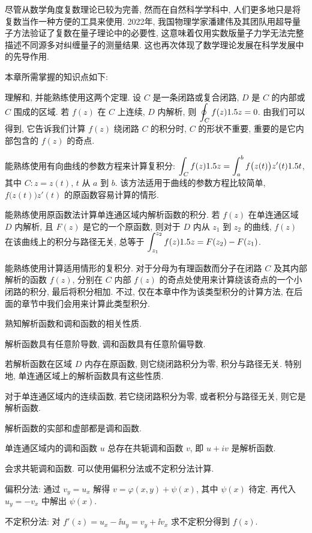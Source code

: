 尽管从数学角度复数理论已较为完善, 然而在自然科学学科中, 人们更多地只是将复数当作一种方便的工具来使用.
2022年, 我国物理学家潘建伟及其团队用超导量子方法验证了复数在量子理论中的必要性, 这意味着仅用实数版量子力学无法完整描述不同源多对纠缠量子的测量结果.
这也再次体现了数学理论发展在科学发展中的先导作用.




本章所需掌握的知识点如下:
\begin{conclusion}
  \item 理解\thmCG 和\thmCCC, 并能熟练使用这两个定理.
  设 $C$ 是一条闭路或复合闭路, $D$ 是 $C$ 的内部或 $C$ 围成的区域.
  若 $f(z)$ 在 $C$ 上连续, $D$ 内解析, 则 $\displaystyle\oint_C f(z)1.5 z=0$.
  由\thmCCC 我们可以得到\thmCT, 它告诉我们计算 $f(z)$ 绕闭路 $C$ 的积分时, $C$ 的形状不重要, 重要的是它内部包含的 $f(z)$ 的奇点.
  \item 能熟练使用有向曲线的参数方程来计算复积分: $\displaystyle\int_C f(z)1.5 z=\int_a^bf\bigl(z(t)\bigr)z'(t)1.5 t$, 其中 $C:z=z(t)$, $t$ 从 $a$ 到 $b$.
  该方法适用于曲线的参数方程比较简单, $f\bigl(z(t)\bigr)z'(t)$ 的原函数容易计算的情形.
  \item 能熟练使用原函数法计算单连通区域内解析函数的积分.
  若 $f(z)$ 在单连通区域 $D$ 内解析, 且 $F(z)$ 是它的一个原函数, 则对于 $D$ 内从 $z_1$ 到 $z_2$ 的曲线, $f(z)$ 在该曲线上的积分与路径无关, 总等于 $\displaystyle\int_{z_1}^{z_2}f(z)1.5 z=F(z_2)-F(z_1)$.
  \item 能熟练使用\thmCIH 计算适用情形的复积分. 对于分母为有理函数而分子在闭路 $C$ 及其内部解析的函数 $f(z)$, 分别在 $C$ 内部 $f(z)$ 的奇点处使用\thmCIH 来计算绕该奇点的一个小闭路的积分, 最后将积分相加.
  不过, \thmCIH 仅在本章中作为该类型积分的计算方法, 在后面的章节中我们会用\thmRes 来计算此类型积分.
  \item 熟知解析函数和调和函数的相关性质.
  \begin{conclusion}
    \item 解析函数具有任意阶导数, 调和函数具有任意阶偏导数.
    \item 若解析函数在区域 $D$ 内存在原函数, 则它绕闭路积分为零, 积分与路径无关. 特别地, 单连通区域上的解析函数具有这些性质.
    \item 对于单连通区域内的连续函数, 若它绕闭路积分为零, 或者积分与路径无关, 则它是解析函数.
    \item 解析函数的实部和虚部都是调和函数.
    \item 单连通区域内的调和函数 $u$ 总存在共轭调和函数 $v$, 即 $u+iv$ 是解析函数.
  \end{conclusion}
  \item 会求共轭调和函数. 可以使用偏积分法或不定积分法计算.
  \begin{conclusion}
    \item 偏积分法: 通过 $v_y=u_x$ 解得 $v=\varphi(x,y)+\psi(x)$, 其中 $\psi(x)$ 待定. 再代入 $u_y=-v_x$ 中解出 $\psi(x)$.
    \item 不定积分法: 对 $f'(z)=u_x-\ii u_y=v_y+\ii v_x$ 求不定积分得到 $f(z)$.
  \end{conclusion}
\end{conclusion}

